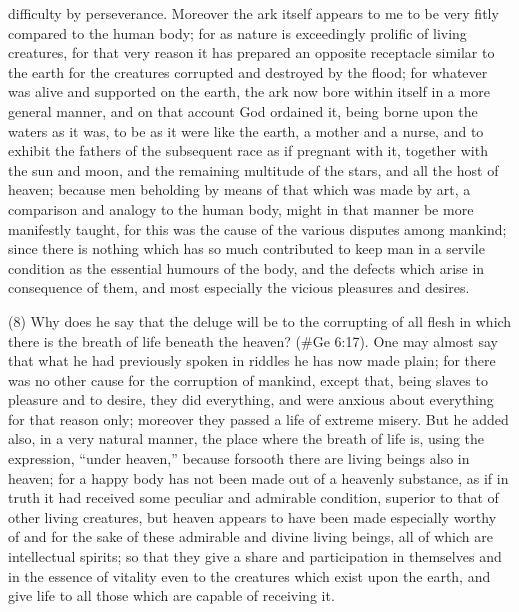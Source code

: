 difficulty by perseverance. Moreover the ark itself appears to me to be very fitly compared to the
human body; for as nature is exceedingly prolific of living creatures, for that very reason it has
prepared an opposite receptacle similar to the earth for the creatures corrupted and destroyed by
the flood; for whatever was alive and supported on the earth, the ark now bore within itself in a
more general manner, and on that account God ordained it, being borne upon the waters as it was,
to be as it were like the earth, a mother and a nurse, and to exhibit the fathers of the subsequent
race as if pregnant with it, together with the sun and moon, and the remaining multitude of the stars,
and all the host of heaven; because men beholding by means of that which was made by art, a
comparison and analogy to the human body, might in that manner be more manifestly taught, for
this was the cause of the various disputes among mankind; since there is nothing which has so
much contributed to keep man in a servile condition as the essential humours of the body, and the
defects which arise in consequence of them, and most especially the vicious pleasures and
desires.

(8) Why does he say that the deluge will be to the corrupting of all flesh in which there is the breath
of life beneath the heaven? (\#Ge 6:17). One may almost say that what he had previously
spoken in riddles he has now made plain; for there was no other cause for the corruption of
mankind, except that, being slaves to pleasure and to desire, they did everything, and were anxious
about everything for that reason only; moreover they passed a life of extreme misery. But he
added also, in a very natural manner, the place where the breath of life is, using the expression,
``under heaven,'' because forsooth there are living beings also in heaven; for a happy body has not
been made out of a heavenly substance, as if in truth it had received some peculiar and admirable
condition, superior to that of other living creatures, but heaven appears to have been made
especially worthy of and for the sake of these admirable and divine living beings, all of which are
intellectual spirits; so that they give a share and participation in themselves and in the essence of
vitality even to the creatures which exist upon the earth, and give life to all those which are capable
of receiving it.

